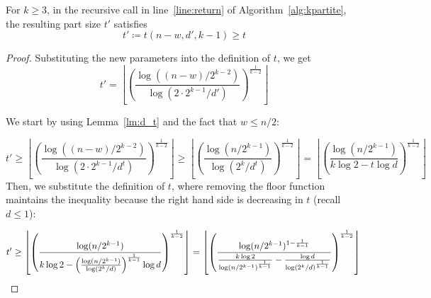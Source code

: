 \begin{lemma}\label{lm:t_prime}
    For $k \geq 3$, in the recursive call in line~\ref{line:return} of Algorithm~\ref{alg:kpartite},
    the resulting part size $t'$ satisfies
    \[
        t' \coloneqq t(n - w, d', k - 1) \geq t
    \]
    
    \begin{proof}

        Substituting the new parameters into the definition of $t$, we get
        \[
            t' = \left\lfloor \left(  \frac{\log ((n-w)/2^{k-2})}{\log (2 \cdot 2^{k-1}/d')} \right)^
            {\frac{1}{k-2}} \right\rfloor
        \]

        We start by using Lemma~\ref{lm:d_t} and the fact that $w \leq n/2$:

        \[
            t' \geq
            \left\lfloor \left(  \frac{\log ((n-w)/2^{k-2})}{\log (2 \cdot 2^{k-1}/d^t)} \right)^
            {\frac{1}{k-2}} \right\rfloor \geq
            \left\lfloor \left(  \frac{\log (n/2^{k-1})}{\log (2^{k}/d^t)} \right)^{\frac{1}{k-2}} \right\rfloor =
            \left\lfloor \left(  \frac{\log (n / 2^{k-1})}{k \log 2 - t \log d} \right)^
            {\frac{1}{k-2}} \right\rfloor
        \]
        Then, we substitute the definition of $t$, where removing the floor function
        maintains the inequality because the right hand side is decreasing in $t$ (recall $d \leq 1$):

        \[
            t' \geq
            \left\lfloor \left(  \frac{\log (n / 2^{k-1})}
            {k \log 2 - \left(  \frac{\log (n / 2^{k-1})}{\log (2^{k}/d)} \right)^{\frac{1}{k-1}}  \log d} \right)^
            {\frac{1}{k-2}} \right\rfloor
            =
            \left\lfloor \left(  \frac{\log (n / 2^{k-1})^{1-\frac{1}{k-1}}}
            {\frac{k \log 2}{\log(n / 2^{k-1})^{\frac{1}{k-1}}} - \frac{\log d}{\log (2^{k}/d)^{\frac{1}{k-1}}} }
            \right)^{\frac{1}{k-2}} \right\rfloor \\
        \]


\end{proof}
\end{lemma}

